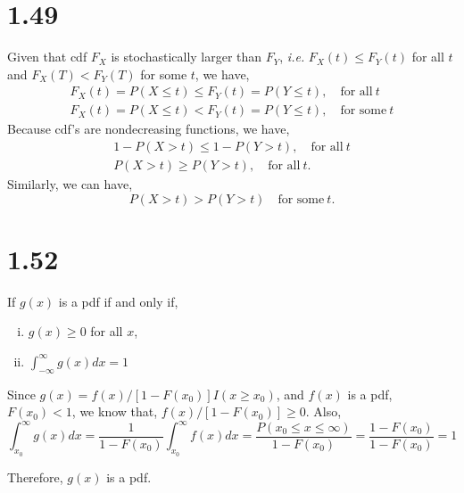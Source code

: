 \documentclass[letterpaper]{article}
\begin{document}
    \section*{1.49}
    Given that cdf $F_X$ is stochastically larger than $F_Y$, \emph{i.e.}  
    $F_X(t) \leq F_Y(t)$ for all $t$ and $F_X(T) < F_Y(T)$ for some $t$,
    we have,
    \begin{eqnarray*}
    F_X(t) = P(X \leq t) \leq F_Y(t) = P(Y \leq t), \quad \text{for all}~t\\
    F_X(t) = P(X \leq t) < F_Y(t) = P(Y \leq t), \quad \text{for some}~t
    \end{eqnarray*}
    Because cdf's are nondecreasing functions, we have,
    \begin{eqnarray*}
    1-P(X > t) \leq 1-P(Y > t), \quad \text{for all}~t\\
    P(X > t) \geq P(Y > t), \quad \text{for all}~t.
    \end{eqnarray*}
    Similarly, we can have,
    \[
    P(X>t) > P(Y>t) \quad \text{for some}~t.
    \]

    \section*{1.52}
    If $g(x)$ is a pdf if and only if,
    \begin{enumerate}[(i)]
        \item $g(x) \geq 0$ for all $x$,
        \item $\int_{-\infty}^{\infty} g(x) dx = 1$
    \end{enumerate}
    Since $g(x) = f(x)/[1-F(x_0)] I(x \geq x_0)$, and $f(x)$ is a pdf, 
    $F(x_0) < 1$, we know that, $f(x)/[1-F(x_0)] \geq 0$.
    Also,
    \[
    \int_{x_0}^\infty g(x)dx = \frac{1}{1-F(x_0)} \int_{x_0}^\infty f(x)dx
    = \frac{P(x_0 \leq x \leq \infty)}{1-F(x_0)} = \frac{1-F(x_0)}{1-F(x_0)} =
    1
    \]

    Therefore, $g(x)$ is a pdf.
\end{document}
